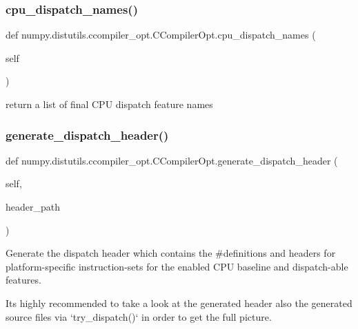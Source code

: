 \subsubsection{\texorpdfstring{cpu\+\_\+dispatch\+\_\+names()}{cpu\_dispatch\_names()}}
{\footnotesize\ttfamily def numpy.\+distutils.\+ccompiler\+\_\+opt.\+C\+Compiler\+Opt.\+cpu\+\_\+dispatch\+\_\+names (\begin{DoxyParamCaption}\item[{}]{self }\end{DoxyParamCaption})}

\begin{DoxyVerb}return a list of final CPU dispatch feature names
\end{DoxyVerb}
 \mbox{\label{classnumpy_1_1distutils_1_1ccompiler__opt_1_1CCompilerOpt_a70d5e06f0d641e5e33890bb95901920f}} 
\subsubsection{\texorpdfstring{generate\+\_\+dispatch\+\_\+header()}{generate\_dispatch\_header()}}
{\footnotesize\ttfamily def numpy.\+distutils.\+ccompiler\+\_\+opt.\+C\+Compiler\+Opt.\+generate\+\_\+dispatch\+\_\+header (\begin{DoxyParamCaption}\item[{}]{self,  }\item[{}]{header\+\_\+path }\end{DoxyParamCaption})}

\begin{DoxyVerb}Generate the dispatch header which contains the #definitions and headers
for platform-specific instruction-sets for the enabled CPU baseline and
dispatch-able features.

Its highly recommended to take a look at the generated header
also the generated source files via `try_dispatch()`
in order to get the full picture.
\end{DoxyVerb}
 \mbox{\label{classnumpy_1_1distutils_1_1ccompiler__opt_1_1CCompilerOpt_a54b4221a3165558c369244e6d34c7885}} 
